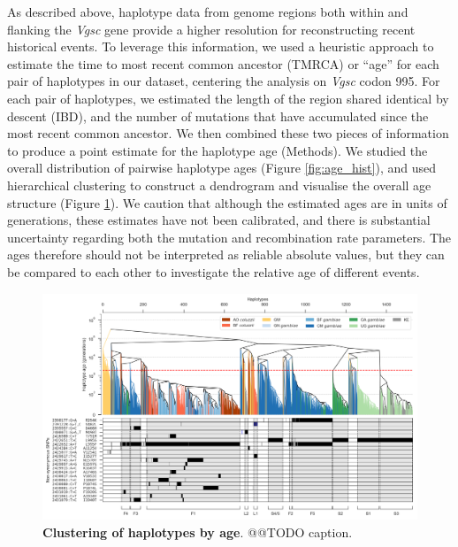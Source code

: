 \documentclass[a4paper,11pt,abstracton]{scrartcl}
\begin{document}
%
As described above, haplotype data from genome regions both within and flanking the \textit{Vgsc} gene provide a higher resolution for reconstructing recent historical events.
%
To leverage this information, we used a heuristic approach to estimate the time to most recent common ancestor (TMRCA) or ``age'' for each pair of haplotypes in our dataset, centering the analysis on \textit{Vgsc} codon 995.
%
For each pair of haplotypes, we estimated the length of the region shared identical by descent (IBD), and the number of mutations that have accumulated since the most recent common ancestor.
%
We then combined these two pieces of information to produce a point estimate for the haplotype age (Methods).
%
We studied the overall distribution of pairwise haplotype ages (Figure \ref{fig:age_hist}), and used hierarchical clustering to construct a dendrogram and visualise the overall age structure (Figure \ref{fig:tree}).
%
We caution that although the estimated ages are in units of generations, these estimates have not been calibrated, and there is substantial uncertainty regarding both the mutation and recombination rate parameters.
%
The ages therefore should not be interpreted as reliable absolute values, but they can be compared to each other to investigate the relative age of different events.

 
%
\begin{figure}[!b]
  \includegraphics[width=1.1\linewidth,center]{artwork/fig_hap_tree.png}
  \caption{\textbf{Clustering of haplotypes by age}. @@TODO caption.}
  \label{fig:tree}
\end{figure}
\end{document}
